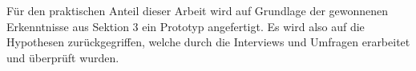 Für den praktischen Anteil dieser Arbeit wird auf Grundlage der gewonnenen Erkenntnisse aus Sektion 3 ein Prototyp angefertigt. Es wird also auf die Hypothesen zurückgegriffen, welche durch die Interviews und Umfragen erarbeitet und überprüft wurden. 

